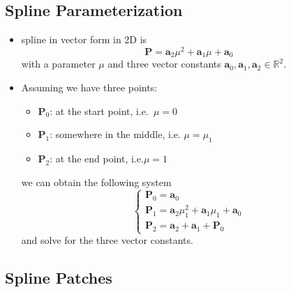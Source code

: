 \documentclass[twocolumn,landscape,10pt]{article}
\theoremstyle{definition}
\begin{document}
\subsection{Spline Parameterization}

\begin{itemize}
    \item spline in vector form in 2D is
        \[
            \mathbf{P}=\mathbf{a}_2\mu^{2}+\mathbf{a}_1\mu+\mathbf{a}_0
        \]
        with a parameter $\mu$ and three vector constants $\mathbf{a}_0,
        \mathbf{a}_1, \mathbf{a}_2\in\mathbb{R}^{2}$.
    \item Assuming we have three points:
        \begin{itemize}
            \item $\mathbf{P}_0$: at the start point, i.e.\ $\mu=0$
            \item $\mathbf{P}_1$: somewhere in the middle, i.e. $\mu=\mu_1$
            \item $\mathbf{P}_2$: at the end point, i.e.$\mu=1$
        \end{itemize} 
        we can obtain the following system
        \[
            \begin{cases}
                \mathbf{P}_0=\mathbf{a}_0 \\
                \mathbf{P}_1=\mathbf{a}_2\mu_1^2+\mathbf{a}_1\mu_1+\mathbf{a}_0 \\
                \mathbf{P}_2=\mathbf{a}_2+\mathbf{a}_1+\mathbf{P}_0
            \end{cases} 
        \] 
        and solve for the three vector constants.
\end{itemize} 

\subsection{Spline Patches}
\end{document}
